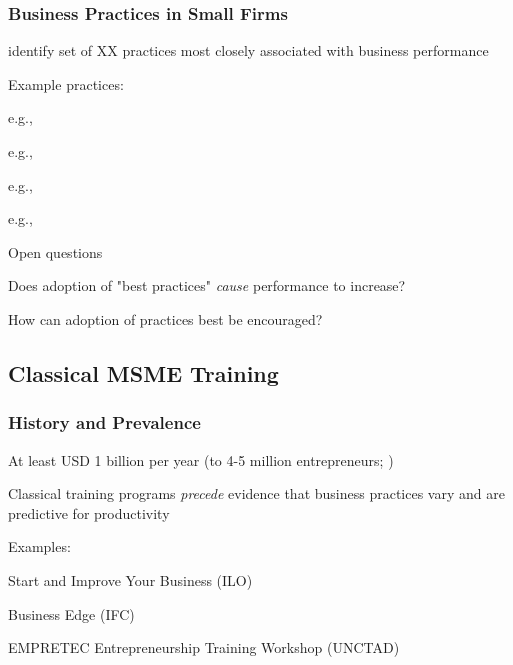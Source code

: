 \documentclass[hideothersubsections, usenames,dvipsnames,11pt]{beamer}
\newenvironment{itemize_2pt}{\itemize\addtolength{\itemsep}{2pt}}{\enditemize}
\newenvironment{enumerate_2pt}{\enumerate\addtolength{\itemsep}{2pt}}{\endenumerate}
\begin{document}
\begin{frame}
\frametitle{Business Practices in Small Firms}
	\citet{McKenzie2017} identify set of XX practices most closely associated with business performance
	\begin{itemize_2pt}
		\item Example practices:
		\begin{enumerate_2pt}
			\item e.g., 
			\item e.g., 
			\item e.g., 
			\item e.g.,  
		\end{enumerate_2pt}
	\end{itemize_2pt}
	
\vspace{0.1in}	
	
	Open questions
	\begin{itemize_2pt}
		\item Does adoption of "best practices" \emph{cause} performance to increase?
		\item How can adoption of practices best be encouraged?
	\end{itemize_2pt}
\end{frame}


\subsection{Classical MSME Training}

\begin{frame}
\frametitle{History and Prevalence}
	\begin{itemize_2pt}
		\item At least \textcolor{bdf}{USD 1 billion per year} (to 4-5 million entrepreneurs; \citet{McKenzie2020})
		\item Classical training programs \emph{precede} evidence that business practices vary and are predictive for productivity
		
		\vspace{0.5em}		
		
		\item Examples:
		\begin{itemize_2pt}
			\item Start and Improve Your Business (ILO)
			\item Business Edge (IFC)
			\item EMPRETEC Entrepreneurship Training Workshop (UNCTAD)
		\end{itemize_2pt} 
	\end{itemize_2pt}
\end{frame}
\end{document}
